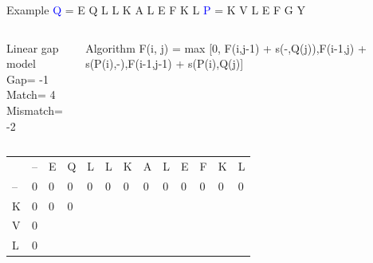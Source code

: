 \documentclass{bredelebeamer}
\begin{document}
 \begin{frame}{Example}
     \centering
 \textcolor{blue}{Q} = E Q L L K A L E F K L \quad \textcolor{blue}{P} = K V L E F G Y
\begin{columns}
\begin{block}{Linear gap model} \\
Gap= -1 \\
Match= 4 \\
Mismatch= -2
\end{block}
\begin{block}{Algorithm}
 F(i, j) =  max [0, F(i,j-1) + s(-,Q(j)),F(i-1,j) + s(P(i),-),F(i-1,j-1) + s(P(i),Q(j)]
\end{block}
\end{columns}
     
     \begin{table}[]
\centering
\begin{tabular}{*{13}{p{0.4cm}}}
                        & --                     & E                      & \cellcolor[HTML]{FF0000}Q                      & L                      & L                      & K                      & A                      & L                      & E                      & F                      & K                      & L                      \\ \cline{2-13} 
\multicolumn{1}{l|}{--} & \multicolumn{1}{l|}{0} & \multicolumn{1}{l|}{0} & \multicolumn{1}{l|}{0} & \multicolumn{1}{l|}{0} & \multicolumn{1}{l|}{0} & \multicolumn{1}{l|}{0} & \multicolumn{1}{l|}{0} & \multicolumn{1}{l|}{0} & \multicolumn{1}{l|}{0} & \multicolumn{1}{l|}{0} & \multicolumn{1}{l|}{0} & \multicolumn{1}{l|}{0} \\ \cline{2-13} 
\multicolumn{1}{l|}{\cellcolor[HTML]{FFFF00}K}  & \multicolumn{1}{l|}{0} & \multicolumn{1}{l|}{0}  & \multicolumn{1}{l|}{0}  & \multicolumn{1}{l|}{}  & \multicolumn{1}{l|}{}  & \multicolumn{1}{l|}{}  & \multicolumn{1}{l|}{}  & \multicolumn{1}{l|}{}  & \multicolumn{1}{l|}{}  & \multicolumn{1}{l|}{}  & \multicolumn{1}{l|}{}  & \multicolumn{1}{l|}{}  \\ \cline{2-13} 
\multicolumn{1}{l|}{V}  & \multicolumn{1}{l|}{0} & \multicolumn{1}{l|}{}  & \multicolumn{1}{l|}{}  & \multicolumn{1}{l|}{}  & \multicolumn{1}{l|}{}  &      \multicolumn{1}{l|}{}  & \multicolumn{1}{l|}{}  & \multicolumn{1}{l|}{}  & \multicolumn{1}{l|}{}  & \multicolumn{1}{l|}{}  & \multicolumn{1}{l|}{}  & \multicolumn{1}{l|}{}  \\ \cline{2-13} %
\multicolumn{1}{l|}{L}  & \multicolumn{1}{l|}{0} & \multicolumn{1}{l|}{}  & \multicolumn{1}{l|}{}  & \multicolumn{1}{l|}{}  & \multicolumn{1}{l|}{}  & \multicolumn{1}{l|}{}  & \multicolumn{1}{l|}{}  & \multicolumn{1}{l|}{}  & \multicolumn{1}{l|}{}  & \multicolumn{1}{l|}{}  & \multicolumn{1}{l|}{}  & \multicolumn{1}{l|}{}  \\ \cline{2-13} 

\end{tabular}
\end{table}
\end{frame}
\end{document}
